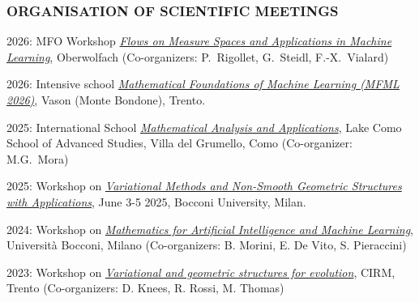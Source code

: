 \documentclass[reqno,11pt]{article}
\let\mysec\subsubsection
\let\mysec\subsubsection
\newcommand{\switch}[2]{\iflanguage{italian}{#1}{#2}}
\theoremstyle{plain}
\begin{document}
  
  



\mysec*{ORGANISATION OF SCIENTIFIC MEETINGS}
2026: MFO Workshop
\href{https://www.mfo.de/www/activity/2613}{\emph{Flows on Measure Spaces and Applications in Machine Learning}},
Oberwolfach
{\small (Co-organizers: P.~Rigollet, G.~Steidl, F.-X.~Vialard)}

2026: Intensive school \href{https://sites.google.com/unitn.it/mfml-2026/home}{\emph{Mathematical Foundations of Machine Learning (MFML 2026)}},
Vason (Monte Bondone), Trento.

2025: International School 
\href{https://mmaa.lakecomoschool.org/}{\emph{Mathematical Analysis and Applications}}, 
Lake Como School of Advanced Studies, Villa del Grumello, Como  
{\small (Co-organizer: M.G.~Mora)}

2025: Workshop on \href{https://bidsa.unibocconi.eu/variational-methods-and-non-smooth-geometric-structures-applications}{\emph{Variational Methods and Non-Smooth Geometric Structures with Applications}}, June 3-5 2025, Bocconi University, Milan.

2024: Workshop on \href{https://dec.unibocconi.eu/mathematics-artificial-intelligence-and-machine-learning}{\emph{Mathematics for Artificial Intelligence and Machine Learning}}, Universit\`a Bocconi, Milano (Co-organizers: B. Morini, E. De Vito, S. Pieraccini)

2023: Workshop on \href{https://sites.google.com/view/vargeo2023/}{\emph{Variational and geometric structures for evolution}}, CIRM, Trento
{\small (Co-organizers: D. Knees, R. Rossi, M. Thomas)}
\end{document}
